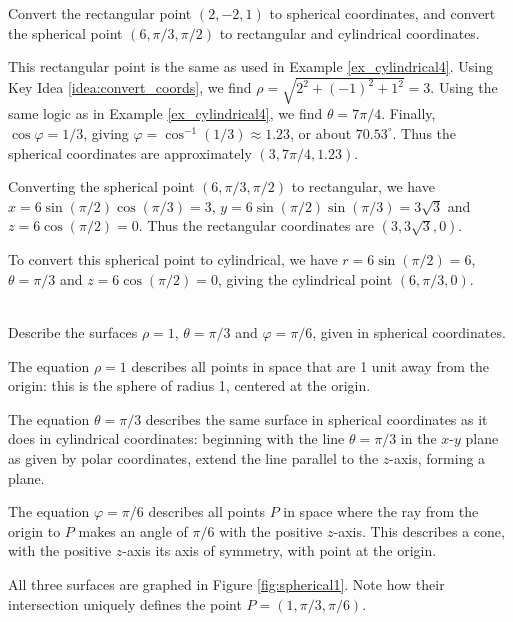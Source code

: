 
{Convert the rectangular point $(2,-2,1)$ to spherical coordinates, and convert the spherical point $(6,\pi/3,\pi/2)$ to rectangular and cylindrical coordinates.
}
{This rectangular point is the same as used in Example \ref{ex_cylindrical4}. Using Key Idea \ref{idea:convert_coords}, we find $\rho = \sqrt{2^2+(-1)^2+1^2} = 3$. Using the same logic as in Example \ref{ex_cylindrical4}, we find $\theta = 7\pi/4$. Finally, $\cos\varphi = 1/3$, giving $\varphi = \cos^{-1}(1/3) \approx 1.23$, or about $70.53^\circ$. Thus the spherical coordinates are approximately $(3,7\pi/4,1.23)$.

Converting the spherical point $(6,\pi/3,\pi/2)$ to rectangular, we have $x = 6\sin(\pi/2)\cos(\pi/3) = 3$, $y = 6\sin(\pi/2)\sin(\pi/3) = 3\sqrt{3}$ and $z = 6\cos(\pi/2) = 0$. Thus the rectangular coordinates are $(3,3\sqrt{3},0)$.

To convert this spherical point to cylindrical, we have $r = 6\sin(\pi/2) = 6$, $\theta = \pi/3$ and $z = 6\cos(\pi/2) =0$, giving the cylindrical point $(6,\pi/3,0)$.
}\\

{Describe the surfaces $\rho=1$, $\theta = \pi/3$ and $\varphi = \pi/6$, given in spherical coordinates.
}
{The equation $\rho = 1$ describes all points in space that are 1 unit away from the origin: this is the sphere of radius 1, centered at the origin.

The equation $\theta = \pi/3$ describes the same surface in spherical coordinates as it does in cylindrical coordinates: beginning with the line $\theta = \pi/3$ in the $x$-$y$ plane as given by polar coordinates, extend the line parallel to the $z$-axis, forming a plane.

The equation $\varphi=\pi/6$ describes all points $P$ in space where the ray from the origin to $P$ makes an angle of $\pi/6$ with the positive $z$-axis. This describes a cone, with the positive $z$-axis its axis of symmetry, with point at the origin.

All three surfaces are graphed in Figure \ref{fig:spherical1}. Note how their intersection uniquely defines the point $P=(1,\pi/3,\pi/6)$.
}\\

